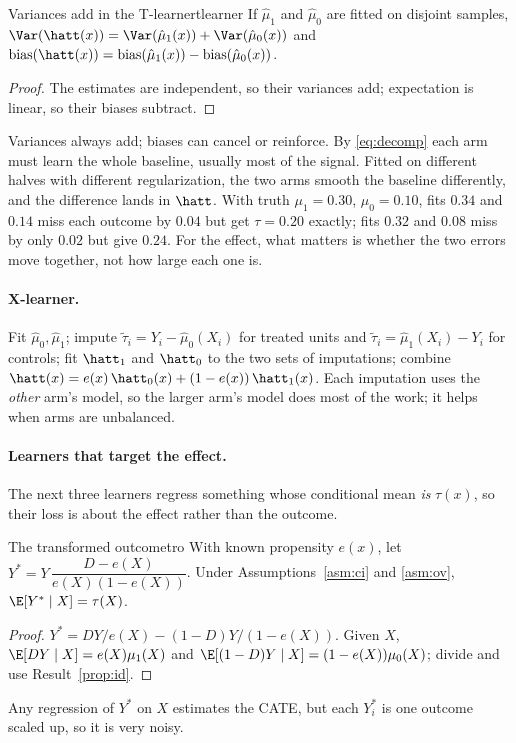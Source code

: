 \documentclass[11pt]{article}
\begin{document}
\begin{prop}{Variances add in the T-learner}{tlearner}
If $\hat\mu_1$ and $\hat\mu_0$ are fitted on disjoint samples,
$\Var(\hatt(x)) = \Var(\hat\mu_1(x)) + \Var(\hat\mu_0(x))$ and
$\text{bias}(\hatt(x)) = \text{bias}(\hat\mu_1(x)) - \text{bias}(\hat\mu_0(x))$.
\end{prop}
\begin{proof}
The estimates are independent, so their variances add; expectation is linear, so their biases subtract.
\end{proof}
Variances always add; biases can cancel or reinforce. By \eqref{eq:decomp} each arm must learn the whole
baseline, usually most of the signal. Fitted on different halves with different regularization, the two arms
smooth the baseline differently, and the difference lands in $\hatt$. With truth $\mu_1 = 0.30$, $\mu_0 = 0.10$,
fits $0.34$ and $0.14$ miss each outcome by $0.04$ but get $\tau = 0.20$ exactly; fits $0.32$ and $0.08$ miss by
only $0.02$ but give $0.24$. For the effect, what matters is whether the two errors move together, not how
large each one is.

\paragraph{X-learner.} Fit $\hat\mu_0, \hat\mu_1$; impute $\tilde\tau_i = Y_i - \hat\mu_0(X_i)$ for treated units and
$\tilde\tau_i = \hat\mu_1(X_i) - Y_i$ for controls; fit $\hatt_1$ and $\hatt_0$ to the two sets of imputations; combine
$\hatt(x) = e(x)\,\hatt_0(x) + (1 - e(x))\,\hatt_1(x)$. Each imputation uses the \emph{other} arm's model, so the
larger arm's model does most of the work; it helps when arms are unbalanced.

\paragraph{Learners that target the effect.} The next three learners regress something whose conditional
mean \emph{is} $\tau(x)$, so their loss is about the effect rather than the outcome.

\begin{prop}{The transformed outcome}{tro}
With known propensity $e(x)$, let $Y^\ast = Y\,\dfrac{D - e(X)}{e(X)(1-e(X))}$. Under Assumptions~\ref{asm:ci}
and \ref{asm:ov}, $\E[Y^\ast \mid X] = \tau(X)$.
\end{prop}
\begin{proof}
$Y^\ast = DY/e(X) - (1-D)Y/(1-e(X))$. Given $X$, $\E[DY \mid X] = e(X)\mu_1(X)$ and
$\E[(1-D)Y \mid X] = (1-e(X))\mu_0(X)$; divide and use Result~\ref{prop:id}.
\end{proof}
Any regression of $Y^\ast$ on $X$ estimates the CATE, but each $Y^\ast_i$ is one outcome scaled up, so it is very
noisy.
\end{document}
